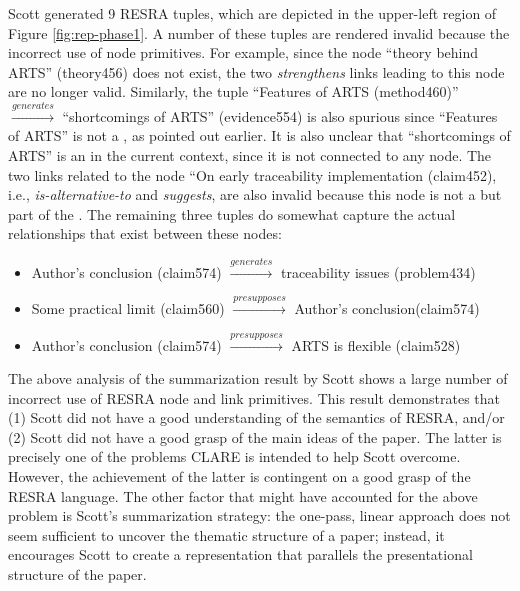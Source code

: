 Scott generated 9 RESRA tuples, which are depicted in the upper-left region
of Figure \ref{fig:rep-phase1}. A number of these tuples are rendered
invalid because the incorrect use of node primitives. For example, since
the node ``theory behind ARTS'' (theory456) does not exist, the two {\it
strengthens\/} links leading to this node are no longer valid.  Similarly,
the tuple ``Features of ARTS (method460)''
\(\stackrel{generates}{\rightarrow}\) ``shortcomings of ARTS''
(evidence554) is also spurious since ``Features of ARTS'' is not a
, as pointed out earlier. It is also unclear that
``shortcomings of ARTS'' is an  in the current
context, since it is not connected to any  node. The two
links related to the node ``On early traceability implementation
(claim452), i.e., {\it is-alternative-to\/} and {\it suggests\/}, are also
invalid because this node is not a  but part of the
. The remaining three tuples do somewhat capture the
actual relationships that exist between these nodes:

\begin{itemize}
\item {\sf Author's conclusion (claim574)\/}
\(\stackrel{generates}{\rightarrow}\) {\sf traceability issues (problem434)\/}

\item {\sf Some practical limit (claim560)\/}
  \(\stackrel{presupposes}{\rightarrow}\) {\sf Author's conclusion(claim574)\/}

\item {\sf Author's conclusion (claim574)\/}
  \(\stackrel{presupposes}{\rightarrow}\) {\sf ARTS is flexible (claim528)\/}
\end{itemize}



The above analysis of the summarization result by Scott shows a large
number of incorrect use of RESRA node and link primitives. This result
demonstrates that (1) Scott did not have a good understanding of the
semantics of RESRA, and/or (2) Scott did not have a good grasp of the main
ideas of the paper. The latter is precisely one of the problems CLARE is
intended to help Scott overcome.  However, the achievement of the latter is
contingent on a good grasp of the RESRA language. The other factor that
might have accounted for the above problem is Scott's summarization
strategy: the one-pass, linear approach does not seem sufficient to uncover
the thematic structure of a paper; instead, it encourages Scott to create a
representation that parallels the presentational structure of the paper.


